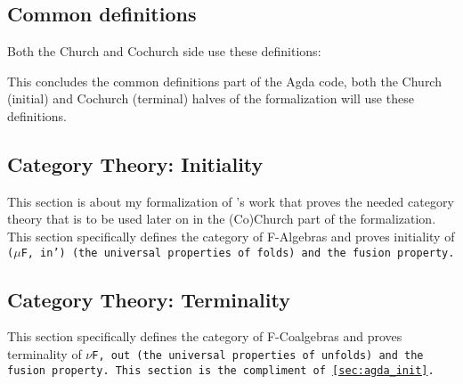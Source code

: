 \subsection{Common definitions}
Both the Church and Cochurch side use these definitions:

This concludes the common definitions part of the Agda code, both the Church (initial) and Cochurch (terminal) halves of the formalization will use these definitions.

\subsection{Category Theory: Initiality}\label{sec:agda_init}
This section is about my formalization of \cite{Harper2011}'s work that proves the needed category theory that is to be used later on in the (Co)Church part of the formalization.
This section specifically defines the category of F-Algebras and proves initiality of \tt($\mu$F, in') (the universal properties of folds) and the fusion property.


\subsection{Category Theory: Terminality}
This section specifically defines the category of F-Coalgebras and proves terminality of \tt{$\nu$F, out} (the universal properties of unfolds) and the fusion property.
This section is the compliment of \autoref{sec:agda_init}.

